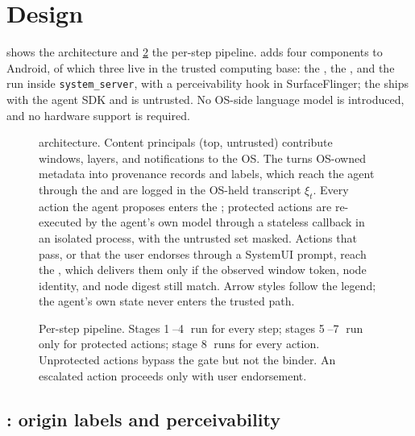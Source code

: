 \section{\PG{} Design}\label{sec:design}

 shows the architecture and \cref{fig:pipeline} the per-step pipeline. \PG{} adds four components to Android, of which three live in the trusted computing base: the \LS{}, the \CG{}, and the \DB{} run inside \texttt{system\_server}, with a perceivability hook in SurfaceFlinger; the \PA{} ships with the agent SDK and is untrusted. No OS-side language model is introduced, and no hardware support is required.

\begin{figure}[t]
  \centering
  
  \caption{\PG{} architecture. Content principals (top, untrusted) contribute windows, layers, and notifications to the OS. The \LS{} turns OS-owned metadata into provenance records and labels, which reach the agent through the \PA{} and are logged in the OS-held transcript $\xi_t$. Every action the agent proposes enters the \CG{}; protected actions are re-executed by the agent's own model through a stateless callback in an isolated process, with the untrusted set masked. Actions that pass, or that the user endorses through a SystemUI prompt, reach the \DB{}, which delivers them only if the observed window token, node identity, and node digest still match. Arrow styles follow the legend; the agent's own state never enters the trusted path.}
  \label{fig:architecture}
\end{figure}

\begin{figure}[t]
  \centering
  
  \caption{Per-step pipeline. Stages \textcircled{\scriptsize 1}--\textcircled{\scriptsize 4} run for every step; stages \textcircled{\scriptsize 5}--\textcircled{\scriptsize 7} run only for protected actions; stage \textcircled{\scriptsize 8} runs for every action. Unprotected actions bypass the gate but not the binder. An escalated action proceeds only with user endorsement.}
  \label{fig:pipeline}
\end{figure}

\subsection{\LS{}: origin labels and perceivability}\label{sec:design-labels}

